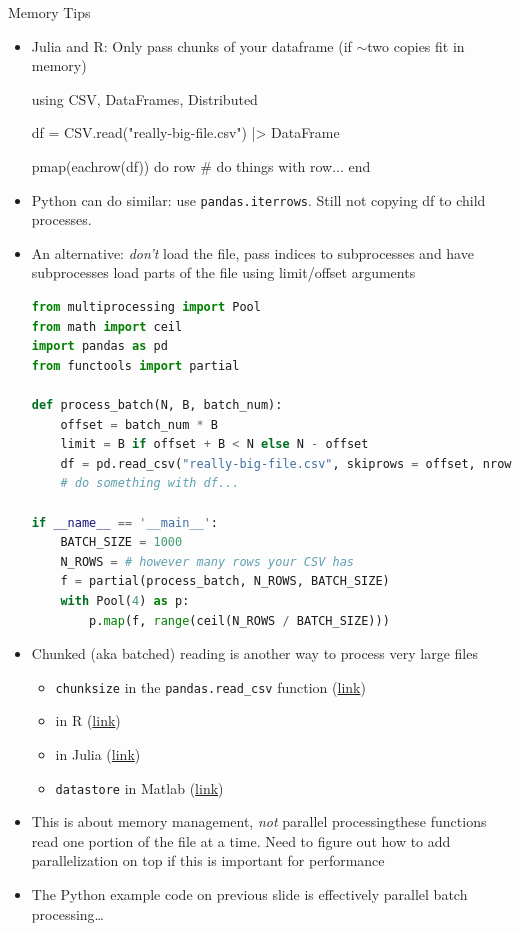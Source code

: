\documentclass[aspectratio=1610,handout]{beamer}
\begin{document}
\begin{frame}{Memory Tips}
    \begin{itemize}
        \item Julia and R: Only pass chunks of your dataframe (if $\sim$two copies fit in memory)
        \begin{jllisting}
using CSV, DataFrames, Distributed

df = CSV.read("really-big-file.csv") |> DataFrame

pmap(eachrow(df)) do row
    # do things with row...
end
        \end{jllisting}
        \item Python can do similar: use \verb|pandas.iterrows|. Still not copying df to child processes.
        \newpage
        \item An alternative: \textit{don't} load the file, pass indices to subprocesses and have subprocesses load parts of the file using limit/offset arguments
\begin{lstlisting}[language=Python]
from multiprocessing import Pool
from math import ceil
import pandas as pd
from functools import partial

def process_batch(N, B, batch_num):
    offset = batch_num * B
    limit = B if offset + B < N else N - offset
    df = pd.read_csv("really-big-file.csv", skiprows = offset, nrows = limit)
    # do something with df...

if __name__ == '__main__':
    BATCH_SIZE = 1000
    N_ROWS = # however many rows your CSV has
    f = partial(process_batch, N_ROWS, BATCH_SIZE)
    with Pool(4) as p:
        p.map(f, range(ceil(N_ROWS / BATCH_SIZE)))
\end{lstlisting}
\newpage

\item Chunked (aka batched) reading is another way to process very large files
\begin{itemize}
    \item \texttt{chunksize} in the \texttt{pandas.read\_csv} function (\href{https://stackoverflow.com/questions/25962114/how-do-i-read-a-large-csv-file-with-pandas}{link})
    \item {} in R (\href{https://readr.tidyverse.org/reference/read_delim_chunked.html}{link})
    \item {} in Julia (\href{https://csv.juliadata.org/stable/reading.html#CSV.Chunks}{link})
    \item \texttt{datastore} in Matlab (\href{https://www.mathworks.com/help/matlab/ref/datastore.html}{link})
\end{itemize}
\item This is about memory management, \textit{not} parallel processing{\textemdash}these functions read one portion of the file at a time. Need to figure out how to add parallelization on top if this is important for performance
\item The Python example code on previous slide is effectively parallel batch processing\dots
    \end{itemize}
\end{frame}
\end{document}
